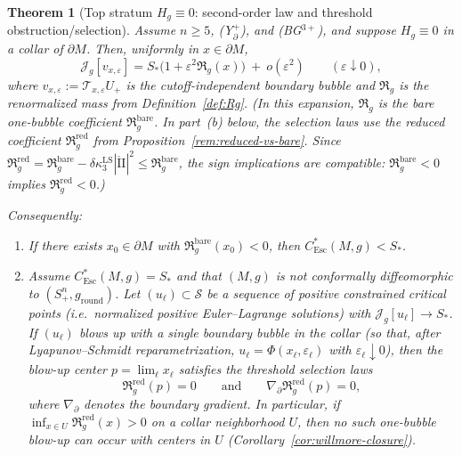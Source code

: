 \documentclass[11pt,reqno,a4paper]{amsart}
\numberwithin{equation}{section}
\theoremstyle{plain}
\newtheorem{theorem}{Theorem}[section]
\theoremstyle{remark}
\theoremstyle{plain}
\begin{document}
\begin{theorem}[Top stratum $H_g\equiv0$: second-order law and threshold obstruction/selection]\label{thm:zmc-second}
Assume $n\ge5$, \textup{(Y$^+_{\partial}$)}, and \textup{(BG$^{3+}$)}, and suppose $H_g\equiv0$ in a collar of $\partial M$.
Then, uniformly in $x\in\partial M$,
\begin{equation}\label{eq:zmc-second-expansion}
\mathcal J_g[v_{x,\varepsilon}]
= S_\ast\Big(1+\varepsilon^2\mathfrak R_g(x)\Big)\ +\ o(\varepsilon^2)\qquad(\varepsilon\downarrow0),
\end{equation}
where $v_{x,\varepsilon}:=\mathcal T_{x,\varepsilon}U_+$ is the cutoff-independent boundary bubble and
$\mathfrak R_g$ is the renormalized mass from Definition~\ref{def:Rg}.
(In this expansion, $\mathfrak R_g$ is the \emph{bare} one-bubble coefficient $\mathfrak R_g^{\mathrm{bare}}$.
In part~(b) below, the selection laws use the \emph{reduced} coefficient $\mathfrak R_g^{\mathrm{red}}$
from Proposition~\ref{rem:reduced-vs-bare}. Since
$\mathfrak R_g^{\mathrm{red}}=\mathfrak R_g^{\mathrm{bare}}-\delta\kappa_3^{\mathrm{LS}}|\mathring{\mathrm{II}}|^2
\le\mathfrak R_g^{\mathrm{bare}}$,
the sign implications are compatible: $\mathfrak R_g^{\mathrm{bare}}<0$ implies $\mathfrak R_g^{\mathrm{red}}<0$.)

\smallskip
Consequently:
\begin{enumerate}[label=(\alph*)]
\item If there exists $x_0\in\partial M$ with $\mathfrak R_g^{\mathrm{bare}}(x_0)<0$, then $C^*_{\mathrm{Esc}}(M,g)<S_\ast$.

\item Assume $C^*_{\mathrm{Esc}}(M,g)=S_\ast$ and that $(M,g)$ is not conformally diffeomorphic to
$(S^n_+,g_{\mathrm{round}})$.
Let $(u_\ell)\subset\mathcal S$ be a sequence of \emph{positive constrained critical
points} (i.e.\ normalized positive Euler--Lagrange solutions) with $\mathcal J_g[u_\ell]\to S_\ast$.
If $(u_\ell)$ blows up with a single boundary bubble in the collar (so that, after Lyapunov--Schmidt reparametrization,
$u_\ell=\Phi(x_\ell,\varepsilon_\ell)$ with $\varepsilon_\ell\downarrow0$),
then the blow-up center $p=\lim_\ell x_\ell$ satisfies the \emph{threshold selection laws}
\begin{equation}\label{eq:zmc-second-selection}
\mathfrak R_g^{\mathrm{red}}(p)=0
\qquad\text{and}\qquad
\nabla_{\partial}\mathfrak R_g^{\mathrm{red}}(p)=0,
\end{equation}
where $\nabla_{\partial}$ denotes the boundary gradient.
In particular, if $\inf_{x\in U}\mathfrak R_g^{\mathrm{red}}(x)>0$ on a collar neighborhood $U$, then no such one-bubble blow-up can occur
with centers in $U$ (Corollary~\ref{cor:willmore-closure}).


\end{enumerate}
\end{theorem}
\end{document}

